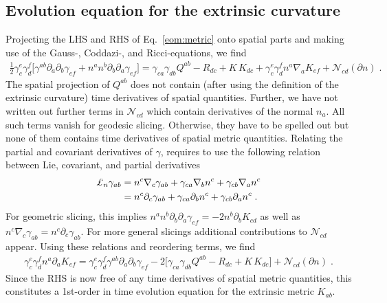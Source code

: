 \documentclass[a4paper,oneside,openany,11pt]{memoir}
\numberwithin{equation}{section} %
\begin{document}
{\subsection{Evolution equation for the extrinsic curvature}
Projecting the LHS and RHS of Eq.~\eqref{eom:metric} onto spatial parts and making use of the Gauss-, Coddazi-, and Ricci-equations, we find
\begin{align}
	\frac{1}{2}\gamma_c^e\gamma_d^f\Big[ 
		\gamma^{ab}\partial_a\partial_b\gamma_{ef}
		+ n^an^b\partial_b\partial_a\gamma_{ef}
	\Big] = \gamma_{ca}\gamma_{db}Q^{ab} - R_{dc} + K\,K_{dc} + \gamma_c^e\gamma_d^f n^a\nabla_a K_{ef}
	+ \mathcal{N}_{cd}(\partial n)\;.
\end{align}
The spatial projection of $Q^{ab}$ does not contain (after using the definition of the extrinsic curvature) time derivatives of spatial quantities. Further, we have not written out further terms in $\mathcal{N}_{cd}$ which contain derivatives of the normal $n_a$. All such terms vanish for geodesic slicing. Otherwise, they have to be spelled out but none of them contains time derivatives of spatial metric quantities. Relating the partial and covariant derivatives of $\gamma$, requires to use the following relation between Lie, covariant, and partial derivatives
\begin{align}
	\pounds_n\gamma_{ab} &= n^c\nabla_c\gamma_{ab} + \gamma_{ca}\nabla_b n^c + \gamma_{cb}\nabla_a n^c
	\notag\\
	&=n^c\partial_c\gamma_{ab} + \gamma_{ca}\partial_b n^c + \gamma_{cb}\partial_a n^c\;.
\end{align}
For geometric slicing, this implies $n^an^b\partial_b\partial_a\gamma_{ef} = -2n^b\partial_bK_{cd}$ as well as $n^c\nabla_c\gamma_{ab} = n^c\partial_c\gamma_{ab}$. For more general slicings additional contributions to $\mathcal{N}_{cd}$ appear. Using these relations and reordering terms, we find
\begin{align}
	\label{eq:evolK}
	\gamma_c^e\gamma_d^f n^a \partial_a K_{ef} = 
	\gamma_c^e\gamma_d^f \gamma^{ab}\partial_a\partial_b\gamma_{ef} 
	- 2\Big[
		\gamma_{ca}\gamma_{db}Q^{ab} - R_{dc} + K\,K_{dc}
	\Big]
	+ \mathcal{N}_{cd}(\partial n)\;.
\end{align}
Since the RHS is now free of any time derivatives of spatial metric quantities, this constitutes a 1st-order in time evolution equation for the extrinsic metric $K_{ab}$.

}
\end{document}
